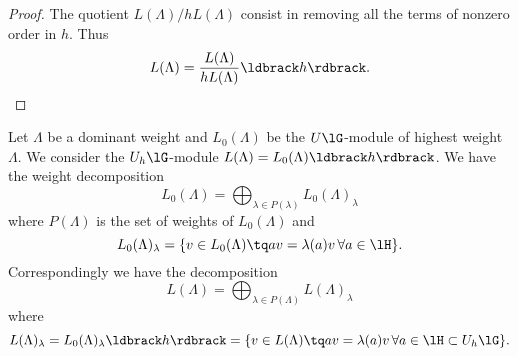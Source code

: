 \begin{proof}
    The quotient \( L(\Lambda)/hL(\Lambda)\) consist in removing all the terms of nonzero order in \( h\). Thus
    \begin{equation}
        L(\Lambda)=\frac{ L(\Lambda) }{ hL(\Lambda) }\ldbrack h\rdbrack.
    \end{equation}
    
\end{proof}

\begin{proposition}
    Let \( \Lambda\) be a dominant weight and \( L_0(\Lambda)\) be the \( U\lG\)-module of highest weight \( \Lambda\). We consider the \( U_h\lG\)-module \( L(\Lambda)=L_0(\Lambda)\ldbrack h\rdbrack\). We have the weight decomposition
    \begin{equation}
        L_0(\Lambda)=\bigoplus_{\lambda\in P(\lambda)}L_0(\Lambda)_{\lambda}
    \end{equation}
    where \( P(\Lambda)\) is the set of weights of \( L_0(\Lambda)\) and
    \begin{equation}
        L_0(\Lambda)_{\lambda}=\{ v\in L_0(\Lambda)\tq av=\lambda(a)v\,\forall a\in\lH \}.
    \end{equation}
    Correspondingly we have the decomposition
    \begin{equation}
        L(\Lambda)=\bigoplus_{\lambda\in P(\Lambda)}L(\Lambda)_{\lambda}
    \end{equation}
    where
    \begin{equation}
        L(\Lambda)_{\lambda}=L_0(\Lambda)_{\lambda}\ldbrack h\rdbrack=\{ v\in L(\Lambda)\tq av=\lambda(a)v\,\forall a\in\lH\subset U_h\lG \}.
    \end{equation}
    
\end{proposition}

